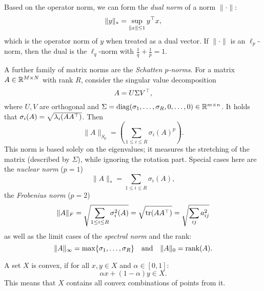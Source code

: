 \documentclass{article}
\begin{document}
Based on the operator norm, we can form the \emph{dual norm} of a norm \(\lVert \cdot \rVert\):
\begin{equation*}
  \lVert y \rVert_{*} = \sup_{\lVert x \rVert \leq 1} y^{\top} x,
\end{equation*}
which is the operator norm of \(y\) when treated as a dual vector.  If \(\lVert \cdot \rVert\) is an
\(\ell_p\)-norm, then the dual is the \(\ell_q\)-norm with \(\frac{1}{q} + \frac{1}{p} = 1\).

A further family of matrix norms are the \emph{Schatten \(p\)-norms}.  For a matrix \(A \in
\mathbb{R}^{M \times N}\) with rank \(R\), consider the singular value decomposition
\begin{equation*}
  A = U \Sigma V^{\top},
\end{equation*}
where \(U, V\) are orthogonal and
\(\Sigma = \operatorname{diag}(\sigma_1, \ldots, \sigma_R, 0, \ldots, 0) \in \mathbb{R}^{m \times n}\).  It holds that
\(\sigma_i(A) = \sqrt{\lambda_i(A A^{\top})}\).  Then
\begin{equation*}
  \lVert A \rVert_{S_p} = \left( \sum_{1 \leq i \leq R} \sigma_i(A)^p \right).
\end{equation*}
This norm is based solely on the eigenvalues; it measures the stretching of the matrix (described by
\(\Sigma\)), while ignoring the rotation part.  Special cases here are the \emph{nuclear norm} (\(p = 1\))
\begin{equation*}
  \lVert A \rVert_{*} = \sum_{1 \leq i \leq R} \sigma_i(A),
\end{equation*}
the \emph{Frobenius norm} (\(p = 2\))
\begin{equation*}
  \lVert A \rVert_{F} = \sqrt{\sum_{1 \leq i \leq R} \sigma_i^2(A)}
    = \sqrt{\operatorname{tr}(AA^{\top})} = \sqrt{\sum_{ij} a_{ij}^2}
\end{equation*}
as well as the limit cases of the \emph{spectral norm} and the rank:
\begin{equation*}
  \lVert A \rVert_{\infty} = \max\{\sigma_1, \ldots, \sigma_R\} \quad \text{and} \quad
  \lVert A \rVert_{0} = \operatorname{rank}(A).
\end{equation*}

\label{s:convex_sets}

A set \(X\) is convex, if for all \(x, y \in X\) and \(\alpha \in [0,1]\):
\begin{equation*}
  \alpha x + (1 - \alpha) y \in X.
\end{equation*}
This means that \(X\) contains all convex combinations of points from it.
\end{document}
